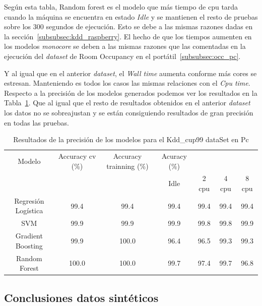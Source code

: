 \documentclass[a4paper, 12pt]{book}
\begin{document}
Según esta tabla, Random forest es el modelo que más tiempo de cpu tarda cuando la máquina se encuentra en estado \textit{Idle} y se mantienen el resto de pruebas sobre los $300$ segundos de ejecución. Esto se debe a las mismas razones dadas en la sección~\ref{subsubsec:kdd_raspberry}. El hecho de que los tiempos aumenten en los modelos \textit{monocore} se deben a las mismas razones que las comentadas en la ejecución del \textit{dataset} de Room Occupancy en el portátil~\ref{subsubsec:occ_pc}.

Y al igual que en el anterior \textit{dataset}, el \textit{Wall time} aumenta conforme más cores se estresan. Manteniendo es todos los casos las mismas relaciones con el \textit{Cpu time}.\\

Respecto a la precisión de los modelos generados podemos ver los resultados en la Tabla~\ref{tab:acc_Kddpc}. Que al igual que el resto de resultados obtenidos en el anterior \textit{dataset} los datos no se sobreajustan y se están consiguiendo resultados de gran precisión en todas las pruebas.

\begin{table}[]
\begin{adjustbox}{width=\textwidth}
\centering
    \begin{tabular}{c  c  c  c  c  c  c}
    \hline
    Modelo & Accuracy cv (\%) & Accuracy trainning (\%) & Acuracy (\%) & & & \\
    \cline{4-7}
     &  &   &  Idle & 2 cpu & 4 cpu & 8 cpu \\
     \hline
     Regresión Logística & 99.4 & 99.4 & 99.4 & 99.4 & 99.4 & 99.4\\
     SVM & 99.9 & 99.9 & 99.9 & 99.8 & 99.8 & 99.9\\
     Gradient Boosting & 99.9 & 100.0 & 96.4 & 96.5 & 99.3 & 99.3 \\
     Random Forest & 100.0 & 100.0 & 99.7 & 97.4 & 99.7 & 96.8\\
    \hline
    \end{tabular}
\end{adjustbox}
\caption{Resultados de la precisión de los modelos para el Kdd\_cup99 dataSet en Pc}
\label{tab:acc_Kddpc}
\end{table}

\subsection{Conclusiones datos sintéticos}
\label{subsec:conclusion_sinteticos}
\end{document}

